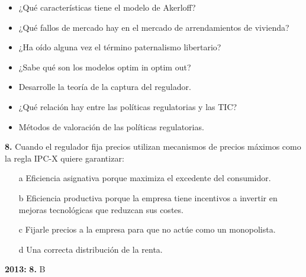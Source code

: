\documentclass{nuevotema}
\begin{document}
\conceptos



\preguntas

\begin{itemize}
    \item ¿Qué características tiene el modelo de Akerloff?
    \item ¿Qué fallos de mercado hay en el mercado de arrendamientos de vivienda?
    \item ¿Ha oído alguna vez el término paternalismo libertario?
    \item ¿Sabe qué son los modelos optim in optim out?
    \item Desarrolle la teoría de la captura del regulador.
    \item ¿Qué relación hay entre las políticas regulatorias y las TIC?
    \item Métodos de valoración de las políticas regulatorias.
\end{itemize}


\textbf{8.} Cuando el regulador fija precios utilizan mecanismos de precios máximos como la regla IPC-X quiere garantizar:
\begin{itemize}
	\item[a] Eficiencia asignativa porque maximiza el excedente del consumidor.
	\item[b] Eficiencia productiva porque la empresa tiene incentivos a invertir en mejoras tecnológicas que reduzcan sus costes.
	\item[c] Fijarle precios a la empresa para que no actúe como un monopolista.
	\item[d] Una correcta distribución de la renta.
\end{itemize}

\notas

\textbf{2013:} \textbf{8.} B

\bibliografia
\end{document}
